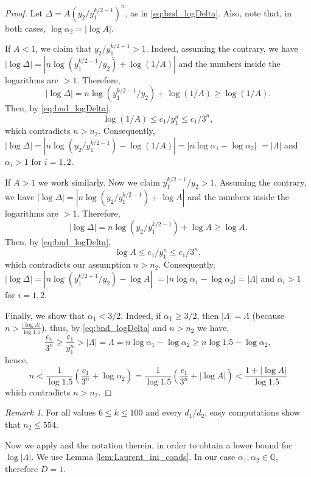 \documentclass[12pt]{amsart}
\numberwithin{equation}{section}
\theoremstyle{definition}
\theoremstyle{remark}
\newtheorem{remark}[lemma]{Remark}
\newcommand{\QQ}{\mathbb{Q}}
\begin{document}
\begin{proof}
Let $\Delta = A\left(y_2/y_1^{k/2-1}\right)^n$, as in 
\eqref{eq:bnd_logDelta}. Also, note that, in both cases,
$\log\alpha_2=|\log A|$.

If $A<1$, we claim that $y_2/y_1^{k/2-1}>1$. Indeed, assuming the contrary, we have $|\log\Delta| = |n\log(y_1^{k/2-1}/y_2)+\log(1/A)| $ and the numbers inside the logarithms are $>1$. Therefore, 
\begin{equation*}
|\log\Delta| = n\log(y_1^{k/2-1}/y_2)+\log(1/A)\geq \log(1/A).
\end{equation*}
Then, by \eqref{eq:bnd_logDelta}, 
\begin{equation*}
\log(1/A)\le c_1/y_1^n\le c_1/3^n,
\end{equation*} 
which contradicts  $n>n_2$. Consequently, 
$|\log\Delta| = |n\log (y_2/y_1^{k/2-1})-\log(1/A)| = |n\log\alpha_1-\log\alpha_2|$ $ = |\Lambda|$ and $\alpha_i>1$ for $i=1,2$.

If $A>1$ we work similarly. Now we claim $y_1^{k/2-1}/y_2>1$. Assuming the contrary, we have  $|\log\Delta| = |n\log(y_2/y_1^{k/2-1})+\log A|$ and the numbers inside the logarithms are $>1$. Therefore, 
\begin{equation*}
|\log\Delta| = n\log(y_2/y_1^{k/2-1})+\log A\geq \log A.
\end{equation*}
Then, by \eqref{eq:bnd_logDelta}, 
\begin{equation*}
\log A\le c_1/y_1^n\le c_1/3^n,
\end{equation*}
which contradicts our assumption $n>n_2$. Consequently, 
$|\log\Delta| = |n\log (y_1^{k/2-1}/y_2)-\log A|$ $=|n\log\alpha_1-\log\alpha_2|=|\Lambda|$ and $\alpha_i>1$ for $i=1,2$.

Finally, we show that $\alpha_1<3/2$. Indeed, if $\alpha_1\ge 3/2$, then $|\Lambda|=\Lambda$ (because $n> \frac{|\log A|}{\log 1.5}$), thus, by \eqref{eq:bnd_logDelta} and $n>n_2$ we have, 
\begin{equation*}
\frac{c_1}{3^n}\ge\frac{c_1}{y_1^n}>|\Lambda| =\Lambda =
n\log\alpha_1-\log\alpha_2\ge n\log 1.5 -\log\alpha_2,
\end{equation*}
hence, 
\begin{equation*}
n<\frac{1}{\log 1.5}\left(\frac{c_1}{3^n}+\log\alpha_2\right)=
\frac{1}{\log 1.5}\left(\frac{c_1}{3^n}+|\log A|\right)
<\frac{1+|\log A|}{\log 1.5}
\end{equation*}
which contradicts $n>n_2$.
\end{proof}
%
\begin{remark} \label{rem:n1}
For all values $6\le k\le 100$ and every $d_1/d_2$, easy computations show that $n_2\le 554$.
\end{remark}
%
Now we apply \cite[Corollary 2]{Laurent08} and the notation
therein, in order to obtain a lower bound for $\log|\Lambda|$. We use Lemma \ref{lem:Laurent_ini_conds}. In our case $\alpha_1,\alpha_2\in\QQ$, therefore $D=1$.
\end{document}

